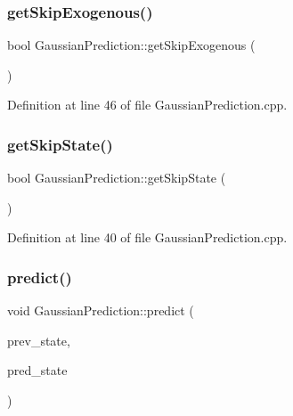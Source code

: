 \subsubsection{\texorpdfstring{get\+Skip\+Exogenous()}{getSkipExogenous()}}
{\footnotesize\ttfamily bool Gaussian\+Prediction\+::get\+Skip\+Exogenous (\begin{DoxyParamCaption}{ }\end{DoxyParamCaption})\hspace{0.3cm}{\ttfamily [inherited]}}



Definition at line 46 of file Gaussian\+Prediction.\+cpp.

\mbox{\label{classbfl_1_1GaussianPrediction_a6885530a677199241b2ac11ccdb09688}} 
\subsubsection{\texorpdfstring{get\+Skip\+State()}{getSkipState()}}
{\footnotesize\ttfamily bool Gaussian\+Prediction\+::get\+Skip\+State (\begin{DoxyParamCaption}{ }\end{DoxyParamCaption})\hspace{0.3cm}{\ttfamily [inherited]}}



Definition at line 40 of file Gaussian\+Prediction.\+cpp.

\mbox{\label{classbfl_1_1GaussianPrediction_a37195b6f9a8799ac3d357500b8142676}} 
\subsubsection{\texorpdfstring{predict()}{predict()}}
{\footnotesize\ttfamily void Gaussian\+Prediction\+::predict (\begin{DoxyParamCaption}\item[{const \mbox{\hyperlink{classbfl_1_1GaussianMixture}{Gaussian\+Mixture}} \&}]{prev\+\_\+state,  }\item[{\mbox{\hyperlink{classbfl_1_1GaussianMixture}{Gaussian\+Mixture}} \&}]{pred\+\_\+state }\end{DoxyParamCaption})\hspace{0.3cm}{\ttfamily [inherited]}}



